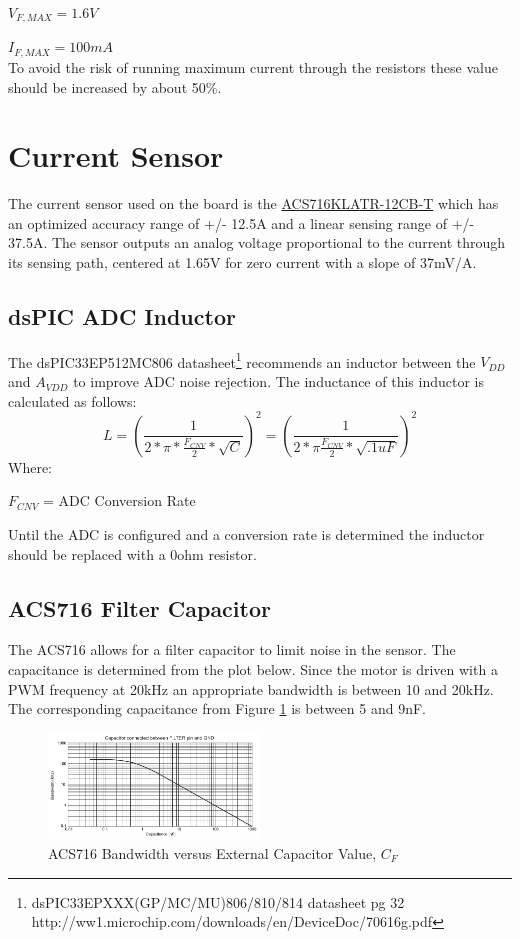 \documentclass{article}
\begin{document}
$V_{F,MAX} =1.6V$

$I_{F,MAX} =100mA$\\
To avoid the risk of running maximum current through the resistors these value should be increased by about 50\%.

\section{Current Sensor}
The current sensor used on the board is the
 \href{file:///Users/ajgriesemer/Downloads/ACS716-Datasheet%20(1).pdf}{ACS716KLATR-12CB-T}
which has an optimized accuracy range of +/- 12.5A and a linear sensing range of +/- 37.5A. The sensor outputs an analog voltage proportional to the current through its sensing path, centered at 1.65V for zero current with a slope of 37mV/A.
\subsection{dsPIC ADC Inductor}
The dsPIC33EP512MC806 datasheet\footnote{\raggedright dsPIC33EPXXX(GP/MC/MU)806/810/814 datasheet pg 32 http://ww1.microchip.com/downloads/en/DeviceDoc/70616g.pdf} 
recommends an inductor between the $V_{DD}$ and $A_{VDD}$ to improve ADC noise rejection. The inductance of this inductor is calculated as follows: \[ L = \left(\frac{1}{2*\pi*\frac{F_{CNV}}{2}*\sqrt{C}} \right)^2 = \left(\frac{1}{2*\pi\frac{F_{CNV}}{2}*\sqrt{.1uF}} \right)^2\]
Where: 

$F_{CNV}$ = ADC Conversion Rate

Until the ADC is configured and a conversion rate is determined the inductor should be replaced with a 0ohm resistor. 
\subsection{ACS716 Filter Capacitor}
The ACS716 allows for a filter capacitor to limit noise in the sensor. The capacitance is determined from the plot below. Since the motor is driven with a PWM frequency at 20kHz an appropriate bandwidth is between 10 and 20kHz. The corresponding capacitance from Figure \ref{fig:filter} is between 5 and 9nF.
\begin{figure}[h]
	\centering
	\includegraphics[width=0.5\textwidth]{acs716filter}
	\caption{ACS716 Bandwidth versus External Capacitor Value, $C_F$\protect\footnotemark}
	\label{fig:filter}
\end{figure}
\end{document}
